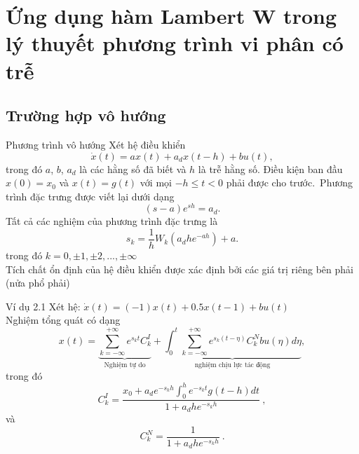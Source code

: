 \documentclass[10pt,notheorems]{beamer}
\theoremstyle{definition}
\theoremstyle{definition}
\theoremstyle{definition}
\begin{document}
\section{Ứng dụng hàm Lambert W trong lý thuyết phương trình vi phân có trễ}
\subsection{Trường hợp vô hướng}

\begin{frame}{Phương trình vô hướng}
Xét hệ điều khiển 
%
\begin{equation}\label{3}
\dot{x}(t)=ax(t)+a_dx(t-h)+bu(t),
\end{equation} \pause
%
trong đó $a$, $b$, $a_d$ là các hằng số đã biết và $h$ là trễ hằng số. Điều kiện ban đầu $x(0)=x_0$ và $x(t)=g(t)$ với mọi $-h\leq t<0$ phải được cho trước.\ \pause Phương trình đặc trưng được viết lại dưới dạng
\begin{equation*}\label{4}
(s-a)e^{sh}=a_d.
\end{equation*} \pause
Tất cả các nghiệm của phương trình đặc trưng là
\begin{equation*}\label{9}
s_k=\dfrac{1}{h}W_k(a_dhe^{-ah})+a.
\end{equation*}
trong đó $k=0,\pm 1,\pm 2,..., \pm\infty$\\ \pause
Tích chất ổn định của hệ điều khiển được xác định bởi các giá trị riêng bên phải (nửa phổ phải)
\end{frame}


\begin{frame}{}
\begin{block}{Ví dụ 2.1}\label{vidu1}
	Xét hệ:  $\dot{x}(t)=(-1)x(t)+0.5x(t-1)+bu(t)$\\\pause
Nghiệm tổng quát có dạng	
\begin{equation}\label{10}
x(t)=\underbrace{\sum\limits^{+\infty}_{k=-\infty}e^{s_kt}C^I_k}_{\text{Nghiệm tự do}}+\underbrace{\int^t_0\sum\limits^{+\infty}_{k=-\infty}e^{s_k(t-\eta)}C^N_kbu(\eta)d\eta}_{\text{nghiệm chịu lực tác động}} ,
\end{equation} \pause
trong đó
\begin{equation}\label{11}
C^I_k=\dfrac{x_0+a_de^{-s_kh}\int^h_0e^{-s_kt}g(t-h)dt}{1+a_dhe^{-s_kh}} \ ,
\end{equation} \pause
và
\begin{equation}\label{12}
C^N_k=\dfrac{1}{1+a_dhe^{-s_kh}} \ .
\end{equation}
\end{block} 	
\end{frame}	
\end{document}
